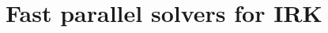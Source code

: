 \documentclass[review]{siamart}
\begin{document}





\section{Fast parallel solvers for IRK}\label{sec:solve}
\end{document}
